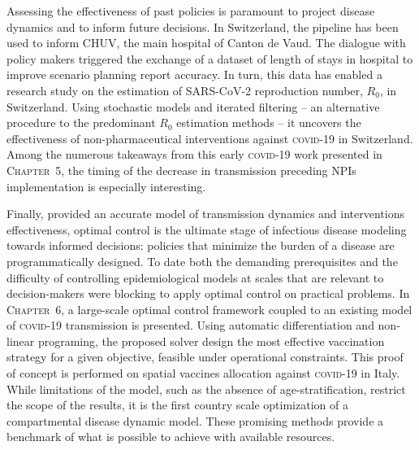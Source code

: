 Assessing the effectiveness of past policies is paramount to project disease dynamics and to inform future decisions. In Switzerland, the pipeline has been used to inform CHUV, the main hospital of Canton de Vaud. The dialogue with policy makers triggered the exchange of a dataset of length of stays in hospital to improve scenario planning report accuracy. In turn, this data has enabled a research study on the estimation of SARS-CoV-2 reproduction number, $R_0$, in Switzerland. Using stochastic models and iterated filtering -- an alternative procedure to the predominant $R_0$ estimation methods\cite{Gostic:PracticalConsiderationsMeasuring:2020a,Pasetto:RangeReproductionNumber:2020} -- it uncovers the effectiveness of non-pharmaceutical interventions against \textsc{covid-19} in Switzerland. Among the numerous takeaways from this early \textsc{covid}-19 work presented in \textsc{Chapter~5}, the timing of the decrease in transmission preceding NPIs implementation is especially interesting. %

Finally, provided an accurate model of transmission dynamics and interventions effectiveness, optimal control is the ultimate stage of infectious disease modeling towards informed decisions: policies that minimize the burden of a disease are programmatically designed. To date both the demanding prerequisites and the difficulty of controlling epidemiological models at scales that are relevant to decision-makers were blocking to apply optimal control on practical problems. In \textsc{Chapter~6}, a large-scale optimal control framework coupled to an existing model of \textsc{covid}-19 transmission\cite{Gatto:SpreadDynamicsCOVID19:2020,Bertuzzo:GeographyCOVID19Spread:2020} is presented.  Using automatic differentiation and non-linear programing, the proposed solver design the most effective vaccination strategy for a given objective, feasible under operational constraints. This proof of concept is performed on spatial vaccines allocation against \textsc{covid}-19 in Italy. While limitations of the model, such as the absence of age-stratification, restrict the scope of the results, it is the first country scale optimization of a compartmental disease dynamic model. These promising methods provide a benchmark of what is possible to achieve with available resources.%


